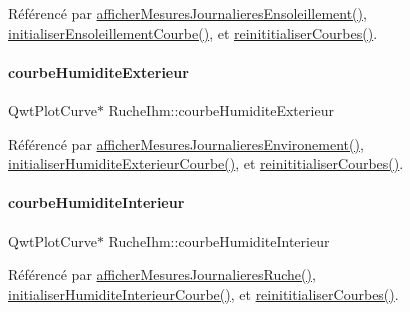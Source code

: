 Référencé par \hyperlink{class_ruche_ihm_abc250d15e6782c522b3d6676e0ee032d}{afficher\+Mesures\+Journalieres\+Ensoleillement()}, \hyperlink{class_ruche_ihm_a18936cec4b04cee55b582847a5f9c0d7}{initialiser\+Ensoleillement\+Courbe()}, et \hyperlink{class_ruche_ihm_a098911c0edd701f7892e3d140ebffbd9}{reinititialiser\+Courbes()}.

\mbox{\label{class_ruche_ihm_a0c9d769a392e3c1332f8908cd9d558eb}} 
\paragraph{\texorpdfstring{courbe\+Humidite\+Exterieur}{courbeHumiditeExterieur}}
{\footnotesize\ttfamily Qwt\+Plot\+Curve$\ast$ Ruche\+Ihm\+::courbe\+Humidite\+Exterieur\hspace{0.3cm}{\ttfamily [private]}}



Référencé par \hyperlink{class_ruche_ihm_a5ee5942435915ca134765f42ff4b9061}{afficher\+Mesures\+Journalieres\+Environement()}, \hyperlink{class_ruche_ihm_ab4bca9c5285c1e9added34ba374eaf84}{initialiser\+Humidite\+Exterieur\+Courbe()}, et \hyperlink{class_ruche_ihm_a098911c0edd701f7892e3d140ebffbd9}{reinititialiser\+Courbes()}.

\mbox{\label{class_ruche_ihm_a19a58f5841dc91eb7f84acd419f35678}} 
\paragraph{\texorpdfstring{courbe\+Humidite\+Interieur}{courbeHumiditeInterieur}}
{\footnotesize\ttfamily Qwt\+Plot\+Curve$\ast$ Ruche\+Ihm\+::courbe\+Humidite\+Interieur\hspace{0.3cm}{\ttfamily [private]}}



Référencé par \hyperlink{class_ruche_ihm_a94bd98327a73a15aad1306fc31f53ce8}{afficher\+Mesures\+Journalieres\+Ruche()}, \hyperlink{class_ruche_ihm_a0ab45ef3e5c512ff1bb4fcfaaa8872bd}{initialiser\+Humidite\+Interieur\+Courbe()}, et \hyperlink{class_ruche_ihm_a098911c0edd701f7892e3d140ebffbd9}{reinititialiser\+Courbes()}.

